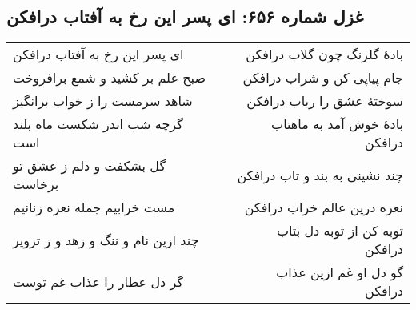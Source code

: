 \begin{center}
\section*{غزل شماره ۶۵۶: ای پسر این رخ به آفتاب درافکن}
\label{sec:656}
\begin{longtable}{l p{0.5cm} r}
ای پسر این رخ به آفتاب درافکن
&&
بادهٔ گلرنگ چون گلاب درافکن
\\
صبح علم بر کشید و شمع برافروخت
&&
جام پیاپی کن و شراب درافکن
\\
شاهد سرمست را ز خواب برانگیز
&&
سوختهٔ عشق را رباب درافکن
\\
گرچه شب اندر شکست ماه بلند است
&&
بادهٔ خوش آمد به ماهتاب درافکن
\\
گل بشکفت و دلم ز عشق تو برخاست
&&
چند نشینی به بند و تاب درافکن
\\
مست خرابیم جمله نعره زنانیم
&&
نعره درین عالم خراب درافکن
\\
چند ازین نام و ننگ و زهد و ز تزویر
&&
توبه کن از توبه دل بتاب درافکن
\\
گر دل عطار را عذاب غم توست
&&
گو دل او غم ازین عذاب درافکن
\\
\end{longtable}
\end{center}
